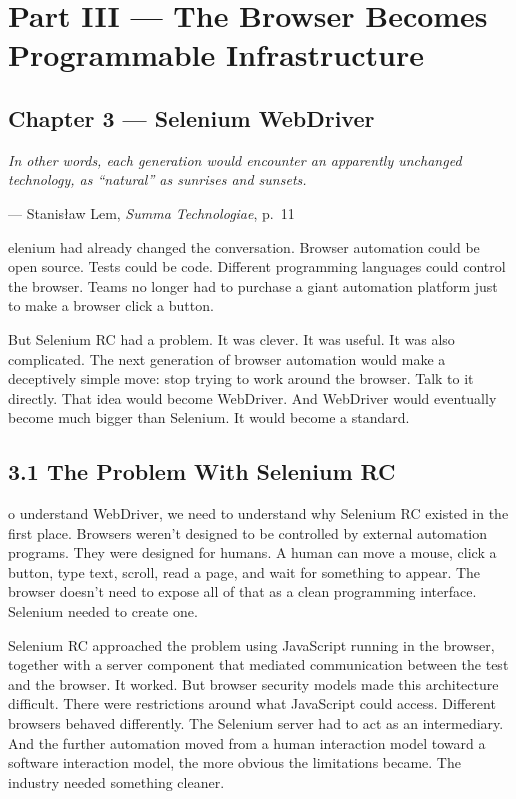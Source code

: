 \documentclass[11pt, a4paper, openany]{book}
\newcommand{\initialcap}[1]{{\fontfamily{lmss}\selectfont\huge\textbf{#1}}}
\providecommand{\epigraphlem}[2]{%
  \begin{flushright}\begin{minipage}{0.72\textwidth}\raggedleft
  \itshape #1\par\vspace{0.4em}\normalfont\small --- #2
  \end{minipage}\end{flushright}\vspace{1.2em}}
\begin{document}
\mainmatter

\chapter*{Part III --- The Browser Becomes Programmable Infrastructure}

\section*{Chapter 3 --- Selenium WebDriver}

\epigraphlem{In other words, each generation would encounter an apparently unchanged technology, as ``natural'' as sunrises and sunsets.}{Stanisław Lem, \textit{Summa Technologiae}, p.~11}


\noindent \initialcap{S}elenium had already changed the conversation. Browser automation could be open source. Tests could be code. Different programming languages could control the browser. Teams no longer had to purchase a giant automation platform just to make a browser click a button. 

But Selenium RC had a problem. It was clever. It was useful. It was also complicated. The next generation of browser automation would make a deceptively simple move: stop trying to work around the browser. Talk to it directly. That idea would become WebDriver. And WebDriver would eventually become much bigger than Selenium. It would become a standard.

\section{3.1 The Problem With Selenium RC}
\noindent \initialcap{T}o understand WebDriver, we need to understand why Selenium RC existed in the first place. Browsers weren't designed to be controlled by external automation programs. They were designed for humans. A human can move a mouse, click a button, type text, scroll, read a page, and wait for something to appear. The browser doesn't need to expose all of that as a clean programming interface. Selenium needed to create one.

Selenium RC approached the problem using JavaScript running in the browser, together with a server component that mediated communication between the test and the browser. It worked. But browser security models made this architecture difficult. There were restrictions around what JavaScript could access. Different browsers behaved differently. The Selenium server had to act as an intermediary. And the further automation moved from a human interaction model toward a software interaction model, the more obvious the limitations became. The industry needed something cleaner.
\end{document}
